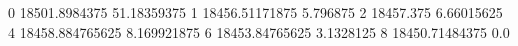 0 18501.8984375 51.18359375
1 18456.51171875 5.796875
2 18457.375 6.66015625
4 18458.884765625 8.169921875
6 18453.84765625 3.1328125
8 18450.71484375 0.0

